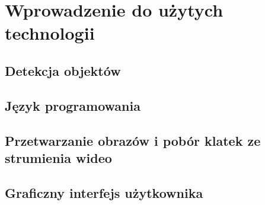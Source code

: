 \chapter{Wprowadzenie do użytych technologii}

\section{Detekcja objektów}


\section{Język programowania}


\section{Przetwarzanie obrazów i pobór klatek ze strumienia wideo}


\section{Graficzny interfejs użytkownika}
